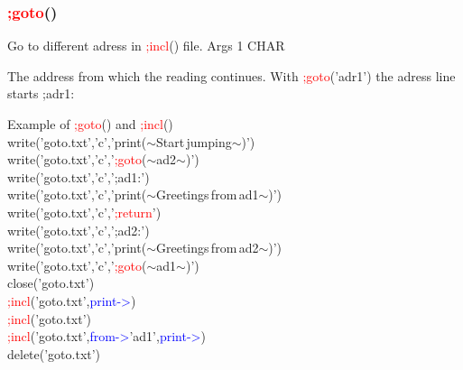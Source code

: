 \subsubsection{\textcolor{Red}{;goto}()}
\label{inpugoto}
Go to different adress in \textcolor{Red}{;incl}() file.
\vspace{0.3cm}
\hline
\vspace{0.3cm}
\noindent Args \tabto{3cm} 1 \tabto{5cm}  CHAR \tabto{7cm}
\begin{changemargin}{3cm}{0cm}
\noindent  The address from which the reading continues. With \textcolor{Red}{;goto}('adr1')
the adress line starts ;adr1:
\end {changemargin}
\hline
\vspace{0.2cm}
\begin{example}[inpugotoex]Example of \textcolor{Red}{;goto}() and \textcolor{Red}{;incl}()\\
\label{inpugotoex}
\textcolor{VioletRed}{write}('goto.txt','c','\textcolor{VioletRed}{print}($\sim$Start\,jumping$\sim$)')\\
\textcolor{VioletRed}{write}('goto.txt','c','\textcolor{Red}{;goto}($\sim$ad2$\sim$)')\\
\textcolor{VioletRed}{write}('goto.txt','c',';ad1:')\\
\textcolor{VioletRed}{write}('goto.txt','c','\textcolor{VioletRed}{print}($\sim$Greetings\,from\,ad1$\sim$)')\\
\textcolor{VioletRed}{write}('goto.txt','c','\textcolor{Red}{;return}')\\
\textcolor{VioletRed}{write}('goto.txt','c',';ad2:')\\
\textcolor{VioletRed}{write}('goto.txt','c','\textcolor{VioletRed}{print}($\sim$Greetings\,from\,ad2$\sim$)')\\
\textcolor{VioletRed}{write}('goto.txt','c','\textcolor{Red}{;goto}($\sim$ad1$\sim$)')\\
\textcolor{VioletRed}{close}('goto.txt')\\
\textcolor{Red}{;incl}('goto.txt',\textcolor{blue}{print->})\\
\textcolor{Red}{;incl}('goto.txt')\\
\textcolor{Red}{;incl}('goto.txt',\textcolor{blue}{from->}'ad1',\textcolor{blue}{print->})\\
delete('goto.txt')
\end{example}
